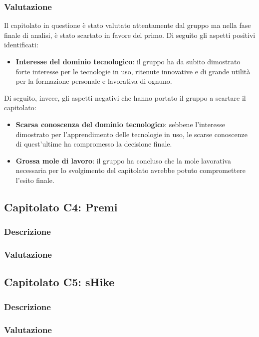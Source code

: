 \subsubsection{Valutazione}
Il capitolato in questione è stato valutato attentamente dal gruppo ma nella fase finale di analisi, è stato scartato in favore del primo. Di seguito gli aspetti positivi identificati:
\begin{itemize}
\item \textbf{Interesse del dominio tecnologico}: il gruppo ha da subito dimostrato forte interesse per le tecnologie in uso, ritenute innovative e di grande utilità per la formazione personale e lavorativa di ognuno.
\end{itemize}
Di seguito, invece, gli aspetti negativi che hanno portato il gruppo a scartare il capitolato:
\begin{itemize}
\item \textbf{Scarsa conoscenza del dominio tecnologico}: sebbene l'interesse dimostrato per l'apprendimento delle tecnologie in uso, le scarse conoscenze di quest'ultime ha compromesso la decisione finale.
\item \textbf{Grossa mole di lavoro}: il gruppo ha concluso che la mole lavorativa necessaria per lo svolgimento del capitolato avrebbe potuto compromettere l'esito finale.
\end{itemize}


\subsection{Capitolato C4: Premi}

\subsubsection{Descrizione}

\subsubsection{Valutazione}



\subsection{Capitolato C5: sHike}

\subsubsection{Descrizione}

\subsubsection{Valutazione}